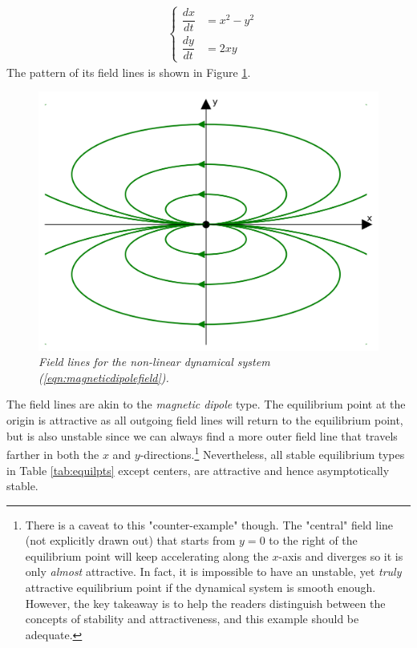\begin{align}
&\left\{\begin{alignedat}{1}
\dfrac{dx}{dt} &= x^2 - y^2 \\
\dfrac{dy}{dt} &= 2xy
\end{alignedat}\right. 
\label{eqn:magneticdipolefield}
\end{align}
The pattern of its field lines is shown in Figure \ref{fig:magneticdipolefield}. 
\begin{figure}
    \centering
    \includegraphics[scale=0.6]{graphics/dipolefield.png}
    \caption{\textit{Field lines for the non-linear dynamical system (\ref{eqn:magneticdipolefield}).}}
    \label{fig:magneticdipolefield}
\end{figure}
The field lines are akin to the \textit{magnetic dipole} type. The equilibrium point at the origin is attractive as all outgoing field lines will return to the equilibrium point, but is also unstable since we can always find a more outer field line that travels farther in both the $x$ and $y$-directions.\footnote{There is a caveat to this "counter-example" though. The "central" field line (not explicitly drawn out) that starts from $y = 0$ to the right of the equilibrium point will keep accelerating along the $x$-axis and diverges so it is only \textit{almost} attractive. In fact, it is impossible to have an unstable, yet \textit{truly} attractive equilibrium point if the dynamical system is smooth enough. However, the key takeaway is to help the readers distinguish between the concepts of stability and attractiveness, and this example should be adequate.} Nevertheless, all stable equilibrium types in Table \ref{tab:equilpts} except centers, are attractive and hence asymptotically stable.

